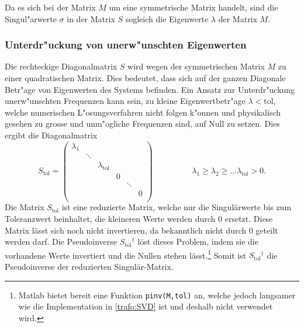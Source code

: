 \begin{refsection}
Da es sich bei der Matrix $M$ um eine symmetrische Matrix handelt, sind die Singul"arwerte $\sigma$ in der Matrix $S$ sogleich die Eigenwerte $\lambda$ der Matrix $M$.

\subsubsection{Unterdr"uckung von unerw"unschten Eigenwerten}
Die rechteckige Diagonalmatrix $S$ wird wegen der symmetrischen Matrix $M$ zu einer quadratischen Matrix. Dies bedeutet, dass sich auf der ganzen Diagonale Betr"age von Eigenwerten des Systems befinden. Ein Ansatz zur Unterdr"uckung unerw"unschten Frequenzen kann sein, zu kleine Eigenwertbetr"age $\lambda < \text{tol}$, welche numerischen L"osungsverfahren nicht folgen k"onnen und physikalisch gesehen zu grosse und unm"ogliche Frequenzen sind, auf Null zu setzen. Dies ergibt die Diagonalmatrix 
\begin{equation*}
	S_\text{tol} = \left( 
			\begin{array}{cccccc}
				\lambda_1 & & & & & \\
				& \ddots & & & &  \\
				& & \lambda_{\text{tol}} & & & \\
				& & & 0 & & \\
				& & & & \ddots & \\
				& & & & & 0 \\				
				\end{array}
			\right) 
			\hspace{2cm}\lambda_1 \geq \lambda_2 \geq \dots \lambda_{\text{tol}} > 0. 
\end{equation*}
Die Matrix $S_\text{tol}$ ist eine reduzierte Matrix, welche nur die Singulärwerte bis zum Toleranzwert beinhaltet, die kleineren Werte werden durch $0$ ersetzt. Diese Matrix lässt sich noch nicht invertieren, da bekanntlich nicht durch $0$ geteilt werden darf. Die Pseudoinverse $S{_\text{tol}}^\dagger$ löst dieses Problem, indem sie die vorhandene Werte invertiert und die Nullen stehen lässt.\footnote{Matlab bietet bereit eine Funktion \texttt{pinv(M,tol)} an, welche jedoch langsamer wie die Implementation in \ref{trafo:SVD} ist und deshalb nicht verwendet wird.} Somit ist $S{_\text{tol}}^\dagger$ die Pseudoinverse der reduzierten Singulär-Matrix.


\end{refsection}
